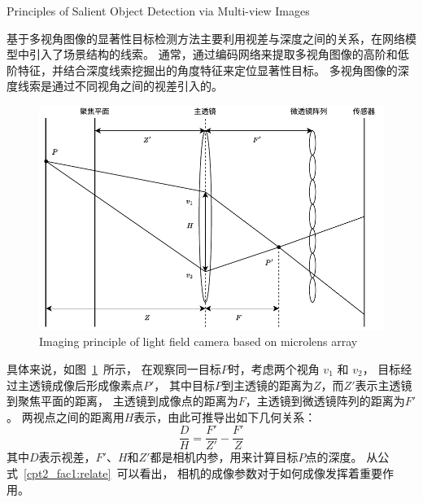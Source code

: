 



{Principles of Salient Object Detection via Multi-view Images}


基于多视角图像的显著性目标检测方法主要利用视差与深度之间的关系，在网络模型中引入了场景结构的线索。
通常，通过编码网络来提取多视角图像的高阶和低阶特征，并结合深度线索挖掘出的角度特征来定位显著性目标。
多视角图像的深度线索是通过不同视角之间的视差引入的。

\begin{figure}[b]
	\centering
	\includegraphics[width=0.90\linewidth]{figures/chapter2/microlens_array_imaging.drawio}
	{Imaging principle of light field camera based on microlens array}  
	\label{cpt2_fig8:multi_array}
\end{figure}

具体来说，如图~\ref{cpt2_fig8:multi_array}~所示，
在观察同一目标$P$时，考虑两个视角 $v_{1}$ 和 $v_{2}$，
目标经过主透镜成像后形成像素点$P'$，
其中目标$P$到主透镜的距离为$Z$，而$Z'$表示主透镜到聚焦平面的距离，
主透镜到成像点的距离为$F$，主透镜到微透镜阵列的距离为$F'$。
两视点之间的距离用$H$表示，由此可推导出如下几何关系：
%
%
\begin{equation}
	\frac{D}{H} = \frac{F'}{Z'} - \frac{F'}{Z} 
	\label{cpt2_fac1:relate}
\end{equation}
%
%
其中$D$表示视差，$F'$、$H$和$Z'$都是相机内参，用来计算目标$P$点的深度。
从公式~\ref{cpt2_fac1:relate}~可以看出，
相机的成像参数对于如何成像发挥着重要作用。



